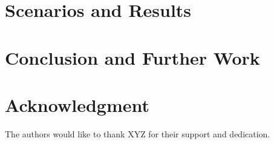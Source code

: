 \documentclass[conference]{IEEEtran}
\begin{document}
\section{Scenarios and Results}
\label{sec:results}


\section{Conclusion and Further Work}
\label{sec:conclusion}


\section*{Acknowledgment}
\label{sec:acknowledgment}

The authors would like to thank XYZ for their support and dedication.



\end{document}
